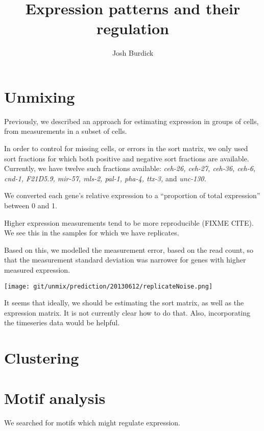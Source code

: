 \documentclass{article}
\begin{document}
\title{Expression patterns and their regulation}
\author{Josh Burdick}
\maketitle

\section*{Unmixing}

Previously, we described an approach for estimating expression in
groups of cells, from measurements in a subset of cells.

In order to control for missing cells, or errors in the sort matrix,
we only used sort fractions for which both positive and negative
sort fractions are available. Currently, we have twelve such fractions
available:
{\em ceh-26, ceh-27, ceh-36, ceh-6, cnd-1, F21D5.9, mir-57, mls-2, pal-1,
pha-4, ttx-3,} and {\em unc-130.}


We converted each gene's relative expression to a ``proportion of total
expression'' between 0 and 1.


Higher expression measurements tend to
be more reproducible (FIXME CITE). We see this in the samples for which
we have replicates.

Based on this, we modelled the measurement error, based on the read count,
so that the measurement standard deviation was
narrower for genes with higher measured
expression.


\texttt{[image: git/unmix/prediction/20130612/replicateNoise.png]}



It seems that ideally, we should be estimating the sort matrix, as well
as the expression matrix. It is not currently clear how to do that.
Also, incorporating the timeseries data would be helpful.


\section*{Clustering}






\section*{Motif analysis}

We searched for motifs which might regulate expression.
\end{document}
